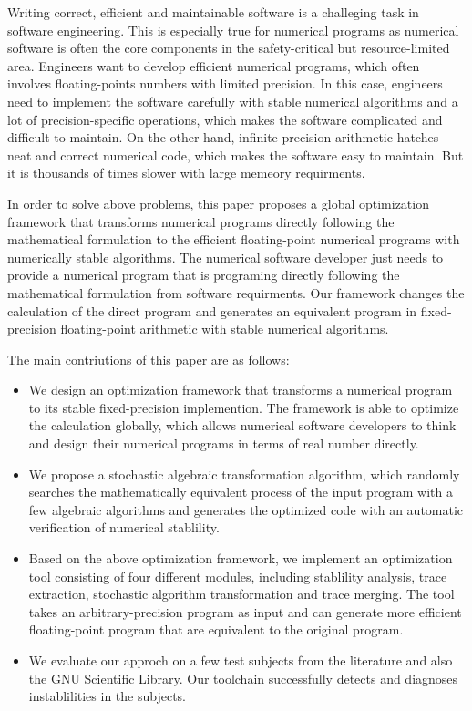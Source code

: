 \documentclass[master,macfonts]{njuthesis}
\begin{document}
\begin{englishabstract}

Writing correct, efficient and maintainable software is a challeging
task in software engineering. This is especially true for numerical 
programs as numerical software is often the core components in the 
safety-critical but resource-limited area. Engineers want to develop 
efficient numerical programs, which often involves floating-points
numbers with limited precision. In this case, engineers need to 
implement the software carefully with stable numerical algorithms 
and a lot of precision-specific operations, which makes the software 
complicated and difficult to maintain. On the other hand, infinite 
precision arithmetic hatches neat and correct numerical code, which 
makes the software easy to maintain. But it is thousands of times 
slower with large memeory requirments.

In order to solve above problems, this paper proposes a global
optimization framework that transforms numerical programs directly
following the mathematical formulation to the efficient floating-point
numerical programs with numerically stable algorithms. The numerical 
software developer just needs to provide a numerical program that is 
programing directly following the mathematical formulation from 
software requirments. Our framework changes the calculation of the 
direct program and generates an equivalent program in fixed-precision
floating-point arithmetic with stable numerical algorithms. 

The main contriutions of this paper are as follows:

\begin{itemize}
  \item 
  We design an optimization framework that transforms a numerical program
  to its stable fixed-precision implemention. The framework is able to 
  optimize the calculation globally, which allows numerical software 
  developers to think and design their numerical programs in terms of real  
  number directly.
  \item 
  We propose a stochastic algebraic transformation algorithm, which randomly searches the mathematically equivalent process of the input program with a few algebraic algorithms and generates the optimized code with an automatic verification of numerical stablility. 
  \item 
  Based on the above optimization framework, we implement an optimization tool consisting of four different modules, including stablility analysis, trace extraction, stochastic algorithm transformation and trace merging. The tool takes an arbitrary-precision program as input and can generate more efficient floating-point program that are equivalent to the original program.
  \item 
  We evaluate our approch on a few test subjects from the literature and also
  the GNU Scientific Library. Our toolchain successfully detects and diagnoses
  instablilities in the subjects.
\end{itemize}


\end{englishabstract}
\end{document}
